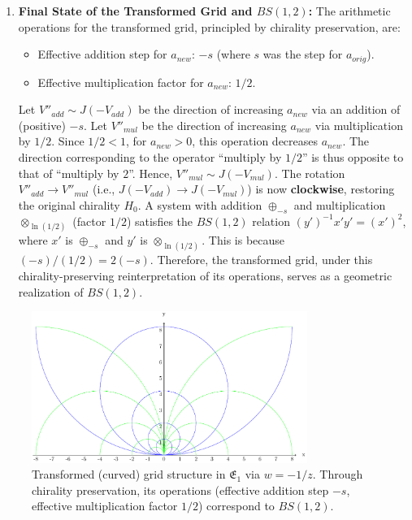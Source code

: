 \begin{enumerate}
    \item \textbf{Final State of the Transformed Grid and $BS(1,2)$:}
    The arithmetic operations for the transformed grid, principled by chirality preservation, are:
    \begin{itemize}
        \item Effective addition step for $a_{new}$: $-s$ (where $s$ was the step for $a_{orig}$).
        \item Effective multiplication factor for $a_{new}$: $1/2$.
    \end{itemize}
    Let $V''_{add} \sim J(-V_{add})$ be the direction of increasing $a_{new}$ via an addition of (positive) $-s$.
    Let $V''_{mul}$ be the direction of increasing $a_{new}$ via multiplication by $1/2$. Since $1/2 < 1$, for $a_{new}>0$, this operation decreases $a_{new}$. The direction corresponding to the operator ``multiply by $1/2$'' is thus opposite to that of ``multiply by $2$''. Hence, $V''_{mul} \sim J(-V_{mul})$.
    The rotation $V''_{add} \to V''_{mul}$ (i.e., $J(-V_{add}) \to J(-V_{mul})$) is now \textbf{clockwise}, restoring the original chirality $H_0$.
    A system with addition $\oplus_{-s}$ and multiplication $\otimes_{\ln(1/2)}$ (factor $1/2$) satisfies the $BS(1,2)$ relation $(y')^{-1}x'y' = (x')^2$, where $x'$ is $\oplus_{-s}$ and $y'$ is $\otimes_{\ln(1/2)}$. This is because $(-s)/(1/2) = 2(-s)$.
    Therefore, the transformed grid, under this chirality-preserving reinterpretation of its operations, serves as a geometric realization of \textbf{$BS(1,2)$}.
\end{enumerate}

\begin{figure}[ht]
\centering
\includegraphics[width=0.8\textwidth]{images/18-grid-example-2.pdf}
\caption{Transformed (curved) grid structure in $\mathfrak{E}_1$ via $w=-1/z$. Through chirality preservation, its operations (effective addition step $-s$, effective multiplication factor $1/2$) correspond to $BS(1,2)$.}\label{fig:grid2_revised}
\end{figure}

